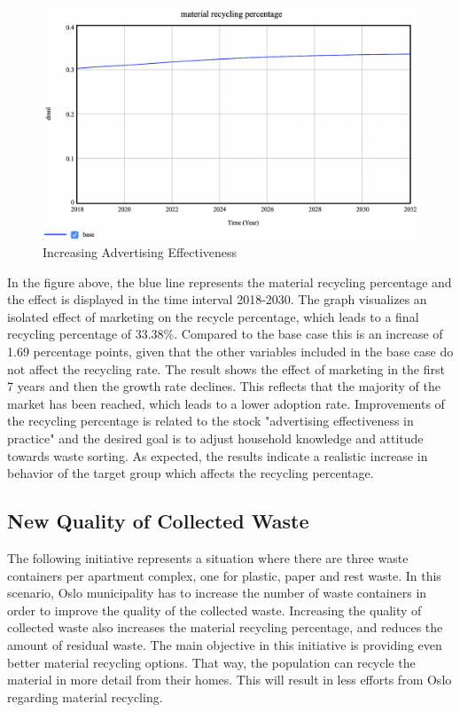 \begin{figure}[H]
\centering
\includegraphics [scale=0.26,angle=360]{figures/advertisingeff.png}
\caption{Increasing Advertising Effectiveness}
\label{fig:advertisingeff}
\end{figure}

\indent \newline
In the figure above, the blue line represents the material recycling percentage and the effect is displayed in the time interval 2018-2030. The graph visualizes an isolated effect of marketing on the recycle percentage, which leads to a final recycling percentage of 33.38\%. Compared to the base case this is an increase of 1.69 percentage points, given that the other variables included in the base case do not affect  the recycling rate. The result shows the effect of marketing in the first 7 years and then the growth rate declines. This reflects that the majority of the market has been reached, which leads to a lower adoption rate. Improvements of the recycling percentage is related to the stock "advertising effectiveness in practice" and the desired goal is to adjust household knowledge and attitude towards waste sorting. As expected, the results indicate a realistic increase in behavior of the target group which affects the recycling percentage. 

\subsection{New Quality of Collected Waste}

\indent \newline
The following initiative represents a situation where there are three waste containers per apartment complex, one for plastic, paper and rest waste. In this scenario, Oslo municipality has to increase the number of waste containers in order to improve the quality of the collected waste. Increasing the quality of collected waste also increases the material recycling percentage, and reduces the amount of residual waste. The main objective in this initiative is providing even better material recycling options. That way, the population can recycle the material in more detail from their homes. This will result in less efforts from Oslo regarding material recycling. 

